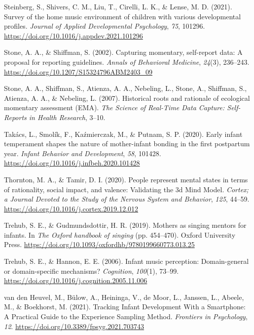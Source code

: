 \documentclass[
]{article}
\newlength{\cslhangindent}
\newenvironment{CSLReferences}[2] %
 {\begin{list}{}{%
  \setlength{\itemindent}{0pt}
  \setlength{\leftmargin}{0pt}
  \setlength{\parsep}{0pt}
  \ifodd #1
   \setlength{\leftmargin}{\cslhangindent}
   \setlength{\itemindent}{-1\cslhangindent}
  \fi
  \setlength{\itemsep}{#2\baselineskip}}}
 {\end{list}}
\begin{document}
\begin{CSLReferences}{1}{0}
Steinberg, S., Shivers, C. M., Liu, T., Cirelli, L. K., \& Lense, M. D.
(2021). Survey of the home music environment of children with various
developmental profiles. \emph{Journal of Applied Developmental
Psychology}, \emph{75}, 101296.
\url{https://doi.org/10.1016/j.appdev.2021.101296}

Stone, A. A., \& Shiffman, S. (2002). Capturing momentary, self-report
data: {A} proposal for reporting guidelines. \emph{Annals of Behavioral
Medicine}, \emph{24}(3), 236--243.
\url{https://doi.org/10.1207/S15324796ABM2403_09}

Stone, A. A., Shiffman, S., Atienza, A. A., Nebeling, L., Stone, A.,
Shiffman, S., Atienza, A. A., \& Nebeling, L. (2007). Historical roots
and rationale of ecological momentary assessment ({EMA}). \emph{The
Science of Real-Time Data Capture: Self-Reports in Health Research},
3--10.

Takács, L., Smolík, F., Kaźmierczak, M., \& Putnam, S. P. (2020). Early
infant temperament shapes the nature of mother-infant bonding in the
first postpartum year. \emph{Infant Behavior and Development},
\emph{58}, 101428. \url{https://doi.org/10.1016/j.infbeh.2020.101428}

Thornton, M. A., \& Tamir, D. I. (2020). People represent mental states
in terms of rationality, social impact, and valence: {Validating} the 3d
{Mind Model}. \emph{Cortex; a Journal Devoted to the Study of the
Nervous System and Behavior}, \emph{125}, 44--59.
\url{https://doi.org/10.1016/j.cortex.2019.12.012}

Trehub, S. E., \& Gudmundsdottir, H. R. (2019). Mothers as singing
mentors for infants. In \emph{The {Oxford} handbook of singing} (pp.
454--470). Oxford University Press.
\url{https://doi.org/10.1093/oxfordhb/9780199660773.013.25}

Trehub, S. E., \& Hannon, E. E. (2006). Infant music perception:
{Domain-general} or domain-specific mechanisms? \emph{Cognition},
\emph{100}(1), 73--99.
\url{https://doi.org/10.1016/j.cognition.2005.11.006}

van den Heuvel, M., Bülow, A., Heininga, V., de Moor, L., Janssen, L.,
Abeele, M., \& Boekhorst, M. (2021). Tracking {Infant Development With}
a {Smartphone}: {A Practical Guide} to the {Experience Sampling Method}.
\emph{Frontiers in Psychology}, \emph{12}.
\url{https://doi.org/10.3389/fpsyg.2021.703743}


\end{CSLReferences}
\end{document}
